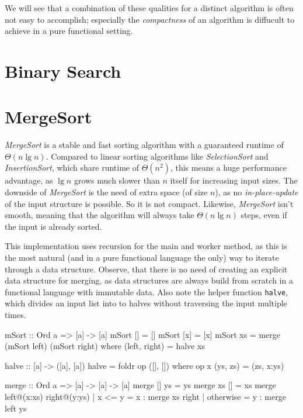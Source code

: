 We will see that a combination of these qualities for a distinct algorithm is often not easy to accomplish; especially the \emph{compactness} of an algorithm is diffucult to achieve in a pure functional setting.

\section{Binary Search}

\section{MergeSort}

\emph{MergeSort} is a stable and fast sorting algorithm with a guaranteed runtime of $\Theta (n \lg n)$.
Compared to linear sorting algorithms like \emph{SelectionSort} and \emph{InsertionSort}, which share runtime of $\Theta (n^2)$, this means a huge performance advantage, as $\lg n$ grows much slower than $n$ itself for increasing input sizes.  
The downside of \emph{MergeSort} is the need of extra space (of size $n$), as no \emph{in-place-update} of the input structure is possible. So it is not compact. Likewise, \emph{MergeSort} isn't smooth, meaning that the algorithm will always take $\Theta (n \lg n)$ steps, even if the input is already sorted.

\begin{impl} \label{impl:mshaskell}
This implementation uses recursion for the main and worker method, as this is the most natural (and in a pure functional language the only) way to iterate through a data structure.
Observe, that there is no need of creating an explicit data structure for merging, as data structures are always build from scratch in a functional language with immutable data.
Also note the helper function \texttt{halve}, which divides an input list into to halves without traversing the input multiple times.
\end{impl}

\begin{haskellcode}
  mSort :: Ord a => [a] -> [a]
  mSort [] = []
  mSort [x] = [x]
  mSort xs = merge (mSort left) (mSort right)
             where (left, right) = halve xs

  halve :: [a] -> ([a], [a])
  halve = foldr op ([], []) where op x (ys, zs) = (zs, x:ys)

  merge :: Ord a => [a] -> [a] -> [a]
  merge [] ys = ys
  merge xs [] = xs
  merge left@(x:xs) right@(y:ys)
      | x <= y    = x : merge xs right
      | otherwise = y : merge left ys
\end{haskellcode}

